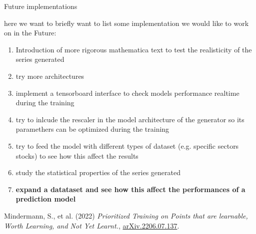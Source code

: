 \documentclass{article}
\begin{document}
    \newpage
    \begin{center}
        {\huge{Future implementations}}
    \end{center} 
    here we want to briefly want to list some implementation we would like to work on in the Future:
    \begin{enumerate}
        \item Introduction of more rigorous mathematica text to test the realisticity of the series generated
        \item try more architectures
        \item implement a tensorboard interface to check models performance realtime during the training
        \item try to inlcude the rescaler in the model architecture of the generator so its paramethers can be optimized during the training
        \item try to feed the model with different types of dataset (e.g. specific sectors stocks) to see how this affect the results
        \item study the statistical properties of the series generated
        \item \textbf{expand a datataset and see how this affect the performances of a prediction model} 
    \end{enumerate}

    
    \begin{thebibliography}{9}
        Mindermann, S., et al. (2022) \emph{Prioritized Training on Points that are learnable, Worth Learning, and Not Yet Learnt.}, \href{https://doi.org/10.48550/arXiv.2206.07137}{arXiv.2206.07.137}.
        
        \bibitem{}
        \end{thebibliography}
\end{document}

